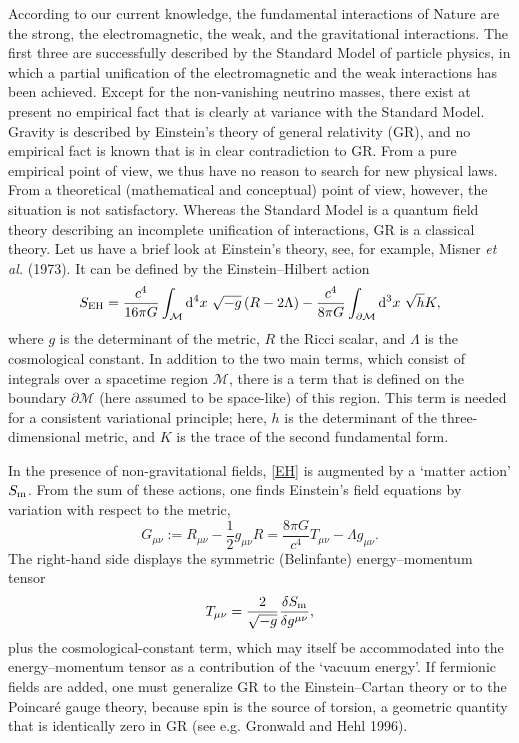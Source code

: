 \documentclass[12pt]{article}
\newcommand{\be}{\begin{equation}}
\newcommand{\ee}{\end{equation}}
\newcommand{\lb}{\label}
\begin{document}
According to our current knowledge, the fundamental interactions of
Nature are the strong, the electromagnetic, the weak, and the
gravitational interactions. The first three are successfully described
by the Standard Model of particle physics, in which a partial
unification of the electromagnetic and the weak interactions has been
achieved. Except for the non-vanishing neutrino masses, there
exist at present no empirical fact that is clearly at variance with the
Standard Model. Gravity is described by Einstein's theory of general
relativity (GR), and no empirical fact is known that is in clear
contradiction to GR. From a pure empirical point of view, we thus have no
reason to search for new physical laws. From a theoretical
(mathematical and conceptual) point of view, however, the situation is
not satisfactory. Whereas the Standard Model is a quantum field theory
describing an incomplete unification of interactions, GR is a
classical theory. Let us have a brief look at Einstein's theory, see,
for example, Misner {\em et al.} (1973). 
It can be defined by the Einstein--Hilbert action
\be
S_{\rm EH}= \frac{c^4}{16\pi G}\int_{\mathcal M}{\rm d}^4x\ \sqrt{-g}
 \left(R-2\Lambda\right)- \frac{c^4}{8\pi G}
\int_{\partial\mathcal M}{\rm d}^3x\ \sqrt{h}K  ,
\lb{EH}
\ee
where $g$ is the determinant of the metric, $R$ the Ricci scalar, and
$\Lambda$ is the cosmological constant. In addition to the two main terms,
which consist of integrals over a spacetime region ${\mathcal M}$,
there is a term that is defined on the boundary ${\partial\mathcal M}$
(here assumed to be space-like) of this region. This term is needed
for a consistent 
variational principle; here, $h$ is the determinant of the
three-dimensional metric, and $K$ is the trace of the second
fundamental form. 

In the presence of non-gravitational fields, \eqref{EH} is augmented
by a `matter action' $S_{\rm m}$. From the sum of these actions,
one finds Einstein's field equations by variation with respect to the metric, 
\be
G_{\mu\nu}:= R_{\mu\nu}-\frac{1}{2}g_{\mu\nu}R
= \frac{8\pi G}{c^4}T_{\mu\nu}-\Lambda g_{\mu\nu} .
\lb{einstein}
\ee
The right-hand side displays the symmetric (Belinfante)
energy--momentum tensor
\be
T_{\mu\nu}=\frac{2}{\sqrt{-g}}\frac{\delta S_{\rm m}}{\delta g^{\mu\nu}} ,
\lb{em}
\ee
plus the cosmological-constant term, which may itself be accommodated
into the energy--momentum tensor as a contribution of the `vacuum energy'. 
If fermionic fields are added, one must generalize GR to the
Einstein--Cartan theory or to the Poincar\'e gauge theory, because spin
is the source of torsion, a geometric quantity that is identically
zero in GR (see e.g. Gronwald and Hehl 1996).
\end{document}
